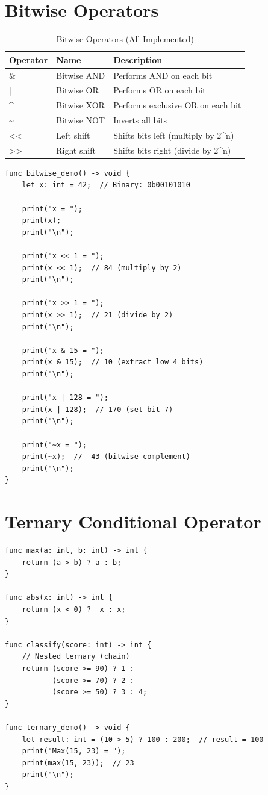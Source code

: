 \documentclass[12pt,a4paper,oneside]{book}
\begin{document}
\section{Bitwise Operators}

\begin{table}[H]
\centering
\caption{Bitwise Operators (All Implemented)}
\begin{tabularx}{\textwidth}{|l|l|X|}
\hline
\textbf{Operator} & \textbf{Name} & \textbf{Description} \\
\hline
\& & Bitwise AND & Performs AND on each bit \\
| & Bitwise OR & Performs OR on each bit \\
\^{} & Bitwise XOR & Performs exclusive OR on each bit \\
\~{} & Bitwise NOT & Inverts all bits \\
<< & Left shift & Shifts bits left (multiply by 2\^{}n) \\
>> & Right shift & Shifts bits right (divide by 2\^{}n) \\
\hline
\end{tabularx}
\end{table}

\begin{lstlisting}[style=algo, caption={Bitwise Operations}]
func bitwise_demo() -> void {
    let x: int = 42;  // Binary: 0b00101010
    
    print("x = ");
    print(x);
    print("\n");
    
    print("x << 1 = ");
    print(x << 1);  // 84 (multiply by 2)
    print("\n");
    
    print("x >> 1 = ");
    print(x >> 1);  // 21 (divide by 2)
    print("\n");
    
    print("x & 15 = ");
    print(x & 15);  // 10 (extract low 4 bits)
    print("\n");
    
    print("x | 128 = ");
    print(x | 128);  // 170 (set bit 7)
    print("\n");
    
    print("~x = ");
    print(~x);  // -43 (bitwise complement)
    print("\n");
}
\end{lstlisting}

\section{Ternary Conditional Operator}

\begin{lstlisting}[style=algo, caption={Ternary Operator (? :)}]
func max(a: int, b: int) -> int {
    return (a > b) ? a : b;
}

func abs(x: int) -> int {
    return (x < 0) ? -x : x;
}

func classify(score: int) -> int {
    // Nested ternary (chain)
    return (score >= 90) ? 1 : 
           (score >= 70) ? 2 : 
           (score >= 50) ? 3 : 4;
}

func ternary_demo() -> void {
    let result: int = (10 > 5) ? 100 : 200;  // result = 100
    print("Max(15, 23) = ");
    print(max(15, 23));  // 23
    print("\n");
}
\end{lstlisting}
\end{document}
